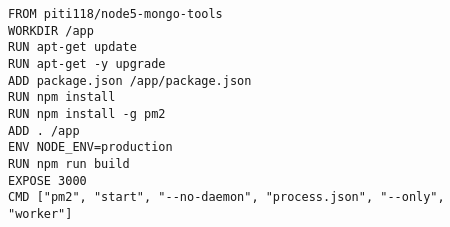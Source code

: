 \begin{verbatim}
FROM piti118/node5-mongo-tools
WORKDIR /app
RUN apt-get update
RUN apt-get -y upgrade
ADD package.json /app/package.json
RUN npm install
RUN npm install -g pm2
ADD . /app
ENV NODE_ENV=production
RUN npm run build
EXPOSE 3000
CMD ["pm2", "start", "--no-daemon", "process.json", "--only", "worker"]
\end{verbatim}